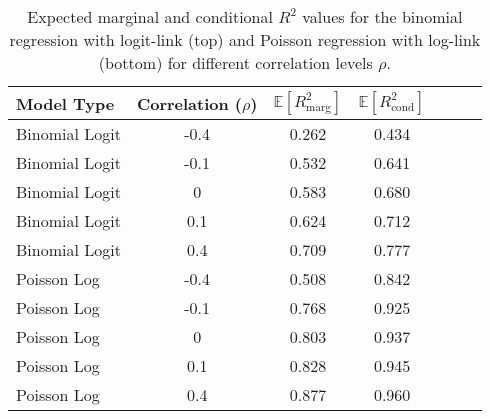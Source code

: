 \begin{table}[H]
    \centering
    \begin{tabular}{lcccccc}
    \toprule
    \textbf{Model Type} & \textbf{Correlation (\(\rho\))} & $\mathbb{E}[R^2_{\text{marg}}]$ &  $\mathbb{E}[R^2_{\text{cond}}]$ \\
    \midrule
    Binomial Logit & -0.4 & 0.262 & 0.434 \\
    Binomial Logit & -0.1 & 0.532 & 0.641 \\
    Binomial Logit & 0    & 0.583 & 0.680 \\
    Binomial Logit & 0.1  & 0.624 & 0.712 \\
    Binomial Logit & 0.4  & 0.709 & 0.777 \\
    \midrule
    Poisson Log  & -0.4 & 0.508 & 0.842 \\
    Poisson Log  & -0.1 & 0.768 & 0.925 \\
    Poisson Log  & 0    & 0.803 & 0.937 \\
    Poisson Log  & 0.1  & 0.828 & 0.945 \\
    Poisson Log  & 0.4  & 0.877 & 0.960 \\
    \bottomrule
    \end{tabular}
    \caption[Expected $R^2$ for non-Gaussian GLMMs]{Expected marginal and conditional $R^2$ values for the binomial regression with logit-link (top) and Poisson regression with log-link (bottom) for different correlation levels $\rho$.}
    \label{table:r2values}
\end{table}


